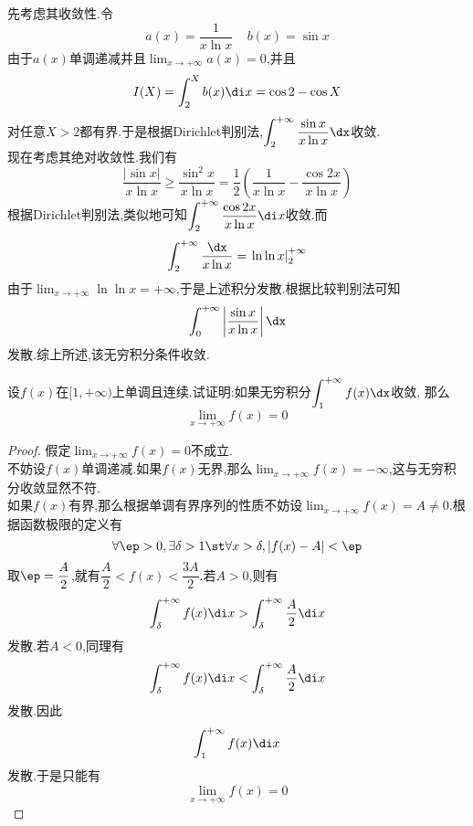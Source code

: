 \documentclass{ctexart}
\begin{document}
\begin{solution}
    先考虑其收敛性.令
    \[a(x)=\dfrac{1}{x\ln x}\ \ \ \ \ b(x)=\sin x\]
    由于$a(x)$单调递减并且$\displaystyle\lim_{x\to+\infty}a(x)=0$,并且
    \[I(X)=\int_2^Xb(x)\di x=\cos 2-\cos X\]
    对任意$X>2$都有界.于是根据Dirichlet判别法,$\displaystyle\int_2^{+\infty}\dfrac{\sin x}{x\ln x}\dx$收敛.\\
    现在考虑其绝对收敛性.我们有
    \[\dfrac{\left|\sin x\right|}{x\ln x}
    \geqslant\dfrac{\sin^2x}{x\ln x}
    =\dfrac{1}{2}\left(\dfrac{1}{x\ln x}-\dfrac{\cos 2x}{x\ln x}\right)\]
    根据Dirichlet判别法,类似地可知$\displaystyle\int_2^{+\infty}\dfrac{\cos 2x}{x\ln x}\di x$收敛.而
    \[\int_2^{+\infty}\dfrac{\dx}{x\ln x}=\left.\ln\ln x\right|_2^{+\infty}\]
    由于$\lim_{x\to+\infty}\ln\ln x=+\infty$,于是上述积分发散.根据比较判别法可知
    \[\int_0^{+\infty}\left|\dfrac{\sin x}{x\ln x}\right|\dx\]
    发散.综上所述,该无穷积分条件收敛.
\end{solution}
\begin{problem}[L.12.4]
    设$f(x)$在$[1,+\infty)$上单调且连续.试证明:如果无穷积分$\displaystyle\int_1^{+\infty}f(x)\dx$收敛,%
    那么
    \[\lim_{x\to+\infty}f(x)=0\]

\end{problem}
\begin{proof}
    假定$\displaystyle\lim_{x\to+\infty}f(x)=0$不成立.\\
    不妨设$f(x)$单调递减.如果$f(x)$无界,那么$\displaystyle\lim_{x\to+\infty}f(x)=-\infty$,这与无穷积分收敛显然不符.\\
    如果$f(x)$有界,那么根据单调有界序列的性质不妨设$\lim_{x\to+\infty}f(x)=A\neq0$.根据函数极限的定义有
    \[\forall\ep>0,\exists\delta>1\st\forall x>\delta,\left|f(x)-A\right|<\ep\]
    取$\ep=\dfrac{A}{2}$,就有$\dfrac{A}{2}<f(x)<\dfrac{3A}{2}$.若$A>0$,则有
    \[\int_\delta^{+\infty}f(x)\di x>\int_\delta^{+\infty}\dfrac{A}{2}\di x\]
    发散.若$A<0$,同理有
    \[\int_\delta^{+\infty}f(x)\di x<\int_\delta^{+\infty}\dfrac{A}{2}\di x\]
    发散.因此
    \[\int_1^{+\infty}f(x)\di x\]
    发散.于是只能有
    \[\displaystyle\lim_{x\to+\infty}f(x)=0\]
    
\end{proof}
\end{document}
